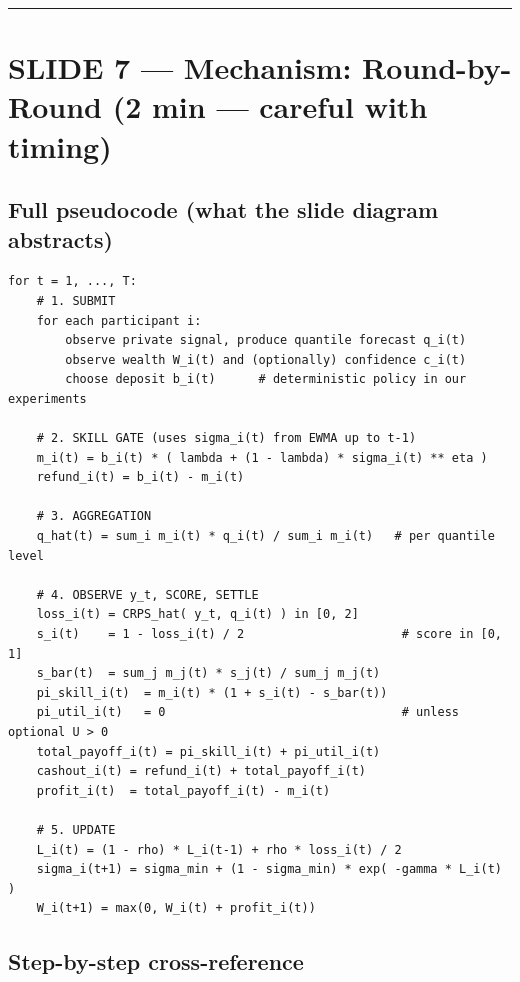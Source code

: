 \documentclass[11pt]{article}
\begin{document}
\bigskip\hrule\bigskip

\section{SLIDE 7 --- Mechanism: Round-by-Round (2 min --- careful with timing)}


\subsection{Full pseudocode (what the slide diagram abstracts)}


\begin{lstlisting}[style=mdstyle]
for t = 1, ..., T:
    # 1. SUBMIT
    for each participant i:
        observe private signal, produce quantile forecast q_i(t)
        observe wealth W_i(t) and (optionally) confidence c_i(t)
        choose deposit b_i(t)      # deterministic policy in our experiments

    # 2. SKILL GATE (uses sigma_i(t) from EWMA up to t-1)
    m_i(t) = b_i(t) * ( lambda + (1 - lambda) * sigma_i(t) ** eta )
    refund_i(t) = b_i(t) - m_i(t)

    # 3. AGGREGATION
    q_hat(t) = sum_i m_i(t) * q_i(t) / sum_i m_i(t)   # per quantile level

    # 4. OBSERVE y_t, SCORE, SETTLE
    loss_i(t) = CRPS_hat( y_t, q_i(t) ) in [0, 2]
    s_i(t)    = 1 - loss_i(t) / 2                      # score in [0, 1]
    s_bar(t)  = sum_j m_j(t) * s_j(t) / sum_j m_j(t)
    pi_skill_i(t)  = m_i(t) * (1 + s_i(t) - s_bar(t))
    pi_util_i(t)   = 0                                 # unless optional U > 0
    total_payoff_i(t) = pi_skill_i(t) + pi_util_i(t)
    cashout_i(t) = refund_i(t) + total_payoff_i(t)
    profit_i(t)  = total_payoff_i(t) - m_i(t)

    # 5. UPDATE
    L_i(t) = (1 - rho) * L_i(t-1) + rho * loss_i(t) / 2
    sigma_i(t+1) = sigma_min + (1 - sigma_min) * exp( -gamma * L_i(t) )
    W_i(t+1) = max(0, W_i(t) + profit_i(t))
\end{lstlisting}

\subsection{Step-by-step cross-reference}
\end{document}
